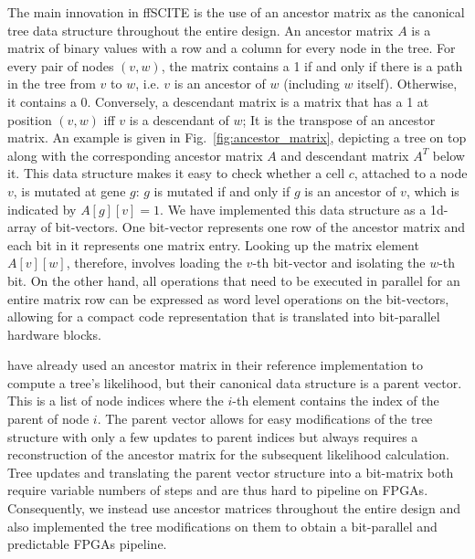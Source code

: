 The main innovation in \ac{ffSCITE} is the use of an ancestor matrix as the canonical tree data structure throughout the entire design. An ancestor matrix $A$ is a matrix of binary values with a row and a column for every node in the tree. For every pair of nodes $(v,w)$, the matrix contains a 1 if and only if there is a path in the tree from $v$ to $w$, i.e. $v$ is an ancestor of $w$ (including $w$ itself). Otherwise, it contains a 0. Conversely, a descendant matrix is a matrix that has a 1 at position $(v,w)$ iff $v$ is a descendant of $w$; It is the transpose of an ancestor matrix. An example is given in Fig.~\ref{fig:ancestor_matrix}, depicting a tree on top along with the corresponding ancestor matrix $A$ and descendant matrix $A^T$ below it. This data structure makes it easy to check whether a cell $c$, attached to a node $v$, is mutated at gene $g$: $g$ is mutated if and only if $g$ is an ancestor of $v$, which is indicated by $A[g][v]=1$. We have implemented this data structure as a 1d-array of bit-vectors. One bit-vector represents one row of the ancestor matrix and each bit in it represents one matrix entry. Looking up the matrix element $A[v][w]$, therefore, involves loading the $v$-th bit-vector and isolating the $w$-th bit. On the other hand, all operations that need to be executed in parallel for an entire matrix row can be expressed as word level operations on the bit-vectors, allowing for a compact code representation that is translated into bit-parallel hardware blocks.

\citeauthor{tree2016} \cite{tree2016} have already used an ancestor matrix in their reference implementation to compute a tree's likelihood, but their canonical data structure is a parent vector. This is a list of node indices where the $i$-th element contains the index of the parent of node $i$. 
The parent vector allows for easy modifications of the tree structure with only a few updates to parent indices but always requires a reconstruction of the ancestor matrix for the subsequent likelihood calculation. Tree updates and translating the parent vector structure into a bit-matrix both require variable numbers of steps and are thus hard to pipeline on FPGAs. Consequently, we instead use ancestor matrices throughout the entire design and also implemented the tree modifications on them to obtain a bit-parallel and predictable \acp{FPGA} pipeline.

